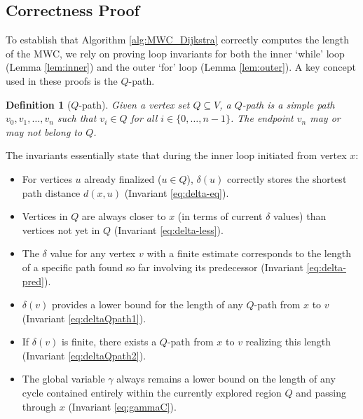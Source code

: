 \documentclass{article}
\newtheorem{definition}{Definition}
\begin{document}
\subsection{Correctness Proof}
\label{subsec:correctness}

To establish that Algorithm \ref{alg:MWC_Dijkstra} correctly computes the length of the MWC, we rely on proving loop invariants for both the inner `while' loop (Lemma \ref{lem:inner}) and the outer `for' loop (Lemma \ref{lem:outer}). A key concept used in these proofs is the $Q$-path.

\begin{definition}[$Q$-path]
Given a vertex set $Q \subseteq V$, a $Q$-path is a simple path $v_0, v_1, \dots, v_n$ such that $v_i \in Q$ for all $i \in \{0, \dots, n-1\}$. The endpoint $v_n$ may or may not belong to $Q$.
\end{definition}

The invariants essentially state that during the inner loop initiated from vertex $x$:
\begin{itemize}
    \item For vertices $u$ already finalized ($u \in Q$), $\delta(u)$ correctly stores the shortest path distance $d(x,u)$ (Invariant \eqref{eq:delta-eq}).
    \item Vertices in $Q$ are always closer to $x$ (in terms of current $\delta$ values) than vertices not yet in $Q$ (Invariant \eqref{eq:delta-less}).
    \item The $\delta$ value for any vertex $v$ with a finite estimate corresponds to the length of a specific path found so far involving its predecessor (Invariant \eqref{eq:delta-pred}).
    \item $\delta(v)$ provides a lower bound for the length of any $Q$-path from $x$ to $v$ (Invariant \eqref{eq:deltaQpath1}).
    \item If $\delta(v)$ is finite, there exists a $Q$-path from $x$ to $v$ realizing this length (Invariant \eqref{eq:deltaQpath2}).
    \item The global variable $\gamma$ always remains a lower bound on the length of any cycle contained entirely within the currently explored region $Q$ and passing through $x$ (Invariant \eqref{eq:gammaC}).
\end{itemize}
\end{document}
